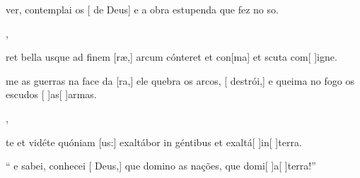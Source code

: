 {    {\item {} ver, contemplai os [ de Deus] e a obra estupenda que fez no so.~\Antiphona},
  {\item {}ret bella usque ad finem [ræ,] arcum cónteret et con[ma] et scuta com[ ]{i}gne.
      ~\Antiphona}%
    {\item {}me as guerras na face da [ra,] ele quebra os arcos, [ destrói,] e queima no fogo os escudos [ ]{as}[ ]{ar}mas.~\Antiphona},
  {\item {}te et vidéte quóniam [us:] exaltábor in géntibus et exaltá[ ]{in}[ ]{ter}ra.~\Antiphona}%
    {\item {}`` e sabei, conhecei [ Deus,] que domino as nações, que domi[ ]{a}[ ]{ter}ra!''~\Antiphona}
}